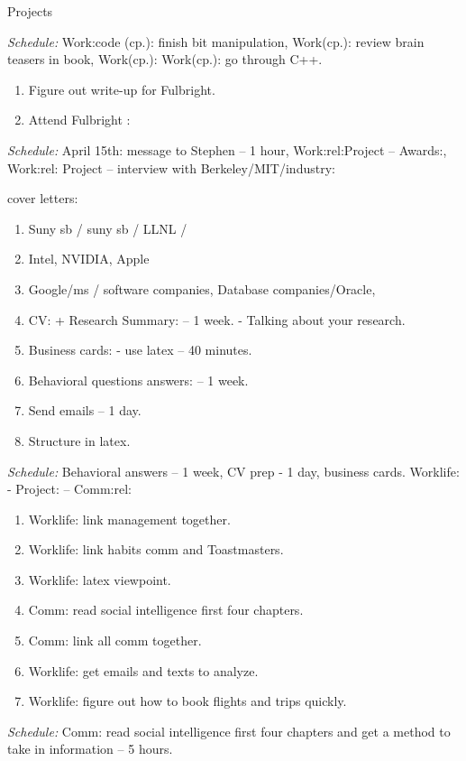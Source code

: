 \documentclass[serif, mathserif, final]{beamer}
\begin{document}
\begin{frame}
\begin{columns}
\begin{block}{Projects}
\begin{enumerate}
\end{enumerate} 
\textit{Schedule:} Work:code (cp.): finish bit manipulation, Work(cp.): review
brain teasers in book, Work(cp.): Work(cp.): go through C++.  \\ 
\begin{enumerate} 
\tiny \item \tiny Figure out write-up for Fulbright.
\item \tiny Attend Fulbright : 
\end{enumerate} 
\textit{Schedule:} April 15th: message to Stephen – 1 hour,
Work:rel:Project – Awards:,  Work:rel: Project – interview with
Berkeley/MIT/industry: 

\tiny \item \tiny cover letters:  

\begin{enumerate} 
\tiny \item \tiny Suny sb / suny sb / LLNL / 
\item \tiny Intel, NVIDIA, Apple
\item \tiny Google/ms / software companies, Database companies/Oracle,

\tiny \item \tiny CV: + Research Summary:  -- 1 week.  - Talking about
your research.

\item \tiny Business cards:  - use latex  -- 40 minutes.
\item \tiny Behavioral questions answers:    -- 1 week. 
\item \tiny Send emails – 1 day. 
\item \tiny Structure in latex. 
\end{enumerate}

\textit{Schedule:} Behavioral answers – 1 week, CV prep - 1 day,
business cards. Worklife: - Project: – Comm:rel: 

\begin{enumerate} 
\tiny \item \tiny Worklife: link management together. 
\item \tiny  Worklife: link habits comm and Toastmasters.
\item \tiny Worklife: latex viewpoint. 
\item \tiny Comm: read social intelligence first four chapters.
\item \tiny  Comm: link all comm together.
\item \tiny Worklife: get emails and texts to analyze. 
\item \tiny  Worklife: figure out how to book flights and trips quickly. 
\end{enumerate}
\textit{Schedule:}  Comm: read social intelligence first four chapters
and get a method to take in information – 5 hours. 


\end{block}
\end{columns}
\end{frame}
\end{document}
